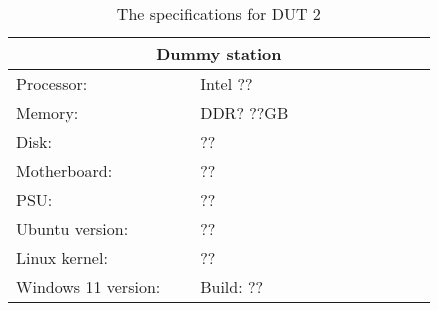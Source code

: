\begin{table}[H]
    \centering
    \begin{tabular}{|| p{0.38\linewidth} | p{0.49\linewidth} ||}
    \hline
    \multicolumn{2}{||c||}{Dummy station}           \\ [0.5ex] \hline\hline
    Processor:          & Intel ?? \\
    Memory:             & DDR? ??GB                     \\
    Disk:               & ?? \\
    Motherboard:        & ??      \\
    PSU:                & ?? \\
    Ubuntu version:     & ??        \\
    Linux kernel:       & ??       \\
    Windows 11 version: & Build: ?? \\ \hline
    \end{tabular}
    \caption{The specifications for DUT 2}
    \label{tab:DUT2}
\end{table}
